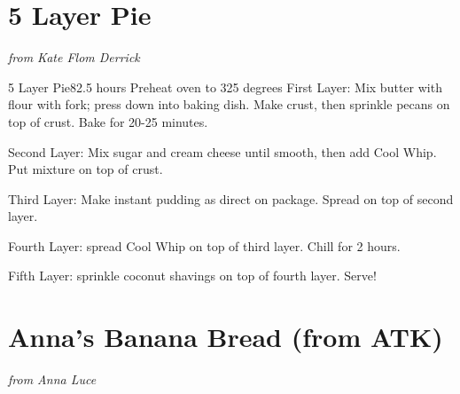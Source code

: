 \documentclass[openany]{book}
\begin{document}
\chapter{5 Layer Pie}\label{layer-pie}

\emph{from Kate Flom Derrick}

\begin{recipe}{5 Layer Pie}{8}{2.5 hours}
\freeform Preheat oven to 325 degrees
First Layer: Mix butter with flour with fork; press down into baking dish. Make crust, then sprinkle pecans on top of crust. Bake for 20-25 minutes.

Second Layer: Mix sugar and cream cheese until smooth, then add Cool Whip. Put mixture on top of crust.

Third Layer: Make instant pudding as direct on package. Spread on top of second layer.

Fourth Layer: spread Cool Whip on top of third layer. Chill for 2 hours.

Fifth Layer: sprinkle coconut shavings on top of fourth layer. Serve!

\end{recipe}

\chapter{Anna's Banana Bread (from
ATK)}\label{annas-banana-bread-from-atk}

\emph{from Anna Luce}
\end{document}
